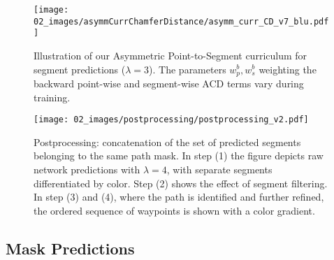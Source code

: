 \begin{figure}[tb]
    \centering
    \texttt{[image: 02\_images/asymmCurrChamferDistance/asymm\_curr\_CD\_v7\_blu.pdf]}
    \caption{
    Illustration of our Asymmetric Point-to-Segment curriculum for segment predictions ($\lambda{=}3$). The parameters $w^b_p,w^b_s$ weighting the backward point-wise and segment-wise ACD terms vary during training.}
    \vspace{-6pt }
    \label{fig:apscurriculum}
\end{figure}

\begin{figure*}[!t]
    \centering
    \texttt{[image: 02\_images/postprocessing/postprocessing\_v2.pdf]}
    \caption{
    Postprocessing: concatenation of the set of predicted segments belonging to the same path mask.
    In step (1) the figure depicts raw network predictions with $\lambda{=}4$, with separate segments differentiated by color. Step (2) shows the effect of segment filtering. In step (3) and (4), where the path is identified and further refined, the ordered sequence of waypoints is shown with a color gradient.}
    \label{fig:postprocessing}
\end{figure*}

\subsection{Mask Predictions}
\label{sec:masks_prediction}

